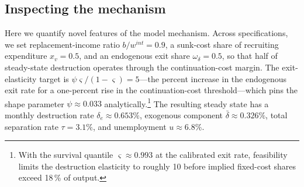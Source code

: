 \documentclass[authoryear, review, 12pt]{elsarticle}
\begin{document}
	
	\subsection{Inspecting the mechanism}\label{sec:mechanism_irfs}

	Here we quantify novel features of the model mechanism. Across specifications, we set replacement-income ratio $b/w^{int}=0.9$,
	a sunk-cost share of recruiting expenditure $x_v=0.5$, and an
	endogenous exit share $\omega_\delta=0.5$, so that half of steady-state destruction operates through the continuation-cost margin.
	The exit-elasticity target is $\psi\varsigma/(1-\varsigma)=5$---the
	percent increase in the endogenous exit rate for a one-percent
	rise in the continuation-cost threshold---which pins the shape
	parameter $\psi\approx0.033$ analytically.\footnote{With the
	survival quantile $\varsigma\approx0.993$ at the calibrated exit
	rate, feasibility limits the destruction elasticity to roughly
	10 before implied fixed-cost shares exceed 18\,\% of output.}
	The resulting steady state has a monthly destruction rate
	$\delta_e\approx0.653\%$, exogenous component
	$\bar\delta\approx0.326\%$, total separation rate $\tau=3.1\%$,
	and unemployment $u\approx6.8\%$.
\end{document}

